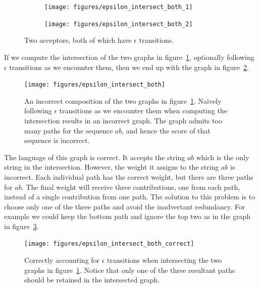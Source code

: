 \begin{figure}
    \centering
    \begin{subfigure}[b]{0.48\textwidth}
        \centering
        \texttt{[image: figures/epsilon\_intersect\_both\_1]}
    \end{subfigure}
    \begin{subfigure}[b]{0.48\textwidth}
        \centering
        \texttt{[image: figures/epsilon\_intersect\_both\_2]}
    \end{subfigure}
    \caption{Two acceptors, both of which have $\epsilon$ transitions.}
    \label{fig:epsilon_intersect_both_inputs}
\end{figure}

If we compute the intersection of the two graphs in
figure~\ref{fig:epsilon_intersect_both_inputs}, optionally following $\epsilon$
transitions as we encounter them, then we end up with the graph in
figure~\ref{fig:epsilon_intersect_both}.

\begin{figure}
    \centering
    \texttt{[image: figures/epsilon\_intersect\_both]}
    \caption{An incorrect composition of the two graphs in
    figure~\ref{fig:epsilon_intersect_both_inputs}. Naively following
    $\epsilon$ transitions as we encounter them when computing the intersection
    results in an incorrect graph. The graph admits too many paths for the
    sequence $ab$, and hence the score of that sequence is incorrect.}
    \label{fig:epsilon_intersect_both}
\end{figure}

The language of this graph is correct. It accepts the string $ab$ which is the
only string in the intersection. However, the weight it assigns to the string
$ab$ is incorrect. Each individual path has the correct weight, but there are
three paths for $ab$. The final weight will receive three contributions, one
from each path, instead of a single contribution from one path. The solution to
this problem is to choose only one of the three paths and avoid the inadvertant
redundancy. For example we could keep the bottom path and ignore the top two as
in the graph in figure~\ref{fig:epsilon_intersect_both_correct}.

\begin{figure}
    \centering
    \texttt{[image: figures/epsilon\_intersect\_both\_correct]}
    \caption{Correctly accounting for $\epsilon$ transitions when intersecting
    the two graphs in figure~\ref{fig:epsilon_intersect_both_inputs}. Notice
    that only one of the three resultant paths should be retained in the
    intersected graph.}
    \label{fig:epsilon_intersect_both_correct}
\end{figure}

